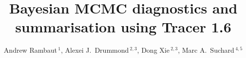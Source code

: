 \documentclass{bioinfo}
\begin{document}

\title[Tracer 1.6]{Bayesian MCMC diagnostics and summarisation using Tracer 1.6}

\author[Rambaut \textit{et~al}]{ Andrew Rambaut\,$^{1}$, Alexei J.~Drummond\,$^{2,3}$, Dong Xie\,$^{2,3}$, Marc A.~Suchard\,$^{4,5}$}

\address{
$^{1}$Institute of Evolutionary Biology, University of Edinburgh, Edinburgh, UK\\
$^{2}$Department of Computer Science, University of Auckland, Auckland, NZ\\
$^{3}$Centre for Computational Evolution, University of Auckland, Auckland, NZ\\
$^{4}$Departments of Biomathematics and Human Genetics, David Geffen School of Medicine, UCLA, and \\
$^{5}$Department of Biostatistics, UCLA Fielding School of Public Health, University of California, Los Angeles, USA \\
}



\maketitle
\end{document}
